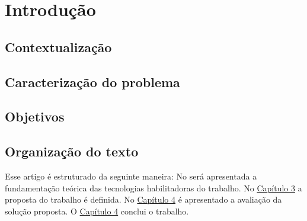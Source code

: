 \chapter{Introdução}

\section{Contextualização}

\Blindtext[2]

\section{Caracterização do problema}

\Blindtext[3]

\section{Objetivos}

\Blindtext[2]

\section{Organização do texto}

Esse artigo é estruturado da seguinte maneira: No %
será apresentada a fundamentação teórica das tecnologias habilitadoras do trabalho. No \underline{Capítulo 3} a proposta do trabalho é definida. No \underline{Capítulo 4} é apresentado a avaliação da solução proposta. O \underline{Capítulo 4} conclui o trabalho.

